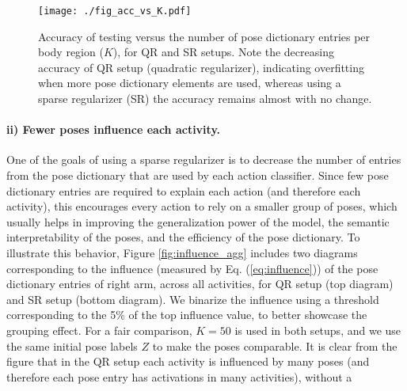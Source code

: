 \begin{figure}[tb]
\begin{center}
\texttt{[image: ./fig\_acc\_vs\_K.pdf]}
\end{center}
\caption{Accuracy of testing versus the number of pose dictionary entries per
body region ($K$), for QR and SR setups. Note the decreasing accuracy of QR
setup (quadratic regularizer), indicating overfitting when more pose dictionary
elements are used, whereas using a sparse regularizer (SR) the accuracy remains
almost with no change. } \label{fig:acc_vs_K_CA}
\end{figure}

\paragraph{ii) Fewer poses influence each activity.}
One of the goals of using a sparse regularizer is to decrease the number of
entries from the pose dictionary that are used by each action classifier.
Since few pose dictionary entries
are required to explain each action (and therefore each activity),
this encourages every action to rely on a smaller group of poses, which usually
helps in improving the generalization power of the model,
the semantic interpretability of the poses,
and the efficiency of the pose dictionary.
To illustrate this behavior, Figure \ref{fig:influence_agg} includes two diagrams corresponding to 
the influence (measured by Eq. (\ref{eq:influence})) of the
pose dictionary entries of right arm, across all activities, for QR setup (top
diagram) and SR setup (bottom diagram). We binarize the influence using a threshold
corresponding to the 5\% of the top influence value, to better showcase the
grouping effect.  For a fair comparison, $K=50$ is used in both setups, and we
use the same initial pose labels $Z$ to make the poses comparable. It is clear
from the figure that in the QR setup each activity is influenced by many poses
(and therefore each pose entry has activations in many activities), without a
